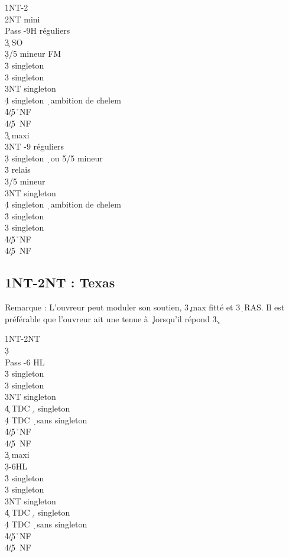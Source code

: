 \documentclass[a4paper]{article}
\begin{document}
\begin{bidtable}
1NT-2\s\\
2NT \> mini\+\\
Pass -9H réguliers\\
3\c \> SO\\
3\d {}/5 mineur FM\\
3\h \> singleton \s \\
3\s \> singleton \h \\
3NT \> singleton \d \\
4\d \> singleton \d\ ambition de chelem\\
4\h {}\c /5\h\ NF\\
4\s {}\c /5\s\ NF\-\\
3\c \> maxi\+\\
3NT -9 réguliers\\
3\d \> singleton \d\ ou 5/5 mineur\+\\
3\h \> relais\+\\
3\s {}/5 mineur\\
3NT \> singleton \d \\
4\d \> singleton \d\ ambition de chelem\-\-\\
3\h \> singleton \s \\
3\s \> singleton \h \\
4\h {}\c /5\h\ NF\\
4\s {}\c /5\s\ NF\-
\end{bidtable}

\subsection{1NT-2NT : Texas \pdfd}

Remarque : L'ouvreur peut moduler son soutien, 3\c\ max fitté et 3\d\ RAS.
Il est préférable que l'ouvreur ait une tenue à \c\ lorsqu'il répond 3\c .

\begin{bidtable}
1NT-2NT\\
3\d\+\\
Pass -6 HL\\
3\h \> singleton \s \\
3\s \> singleton \h \\
3NT \> singleton \c \\
4\c \> TDC \d , singleton \c \\
4\d \> TDC \d\ sans singleton\\
4\h {}\c /5\h\ NF\\
4\s {}\c /5\s\ NF\-\\
3\c \> maxi\+\\
3\d {}-6HL\\
3\h \> singleton \s \\
3\s \> singleton \h \\
3NT \> singleton \c \\
4\c \> TDC \d , singleton \c \\
4\d \> TDC \d\ sans singleton\\
4\h {}\c /5\h\ NF\\
4\s {}\c /5\s\ NF\-
\end{bidtable}
\end{document}
